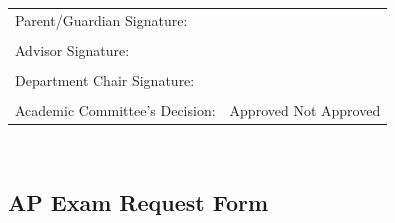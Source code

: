 \vspace{1cm}
\noindent\hrulefill
\vspace{.5cm}

\renewcommand{\arraystretch}{1}
\noindent\begin{tabular}{ll}
Parent/Guardian Signature: & \underline{\hspace{7cm}}\\
&\\
Advisor Signature:  & \underline{\hspace{7cm}}\\
&\\
Department Chair Signature: &  \underline{\hspace{7cm}}\\
&\\
Academic Committee’s Decision:	& Approved  \hspace{.5cm} 	Not Approved
\end{tabular}\\

\vspace{.5cm}
 


\vspace{1cm}





\newpage

\subsection{AP Exam Request Form}

\vspace{1cm}

